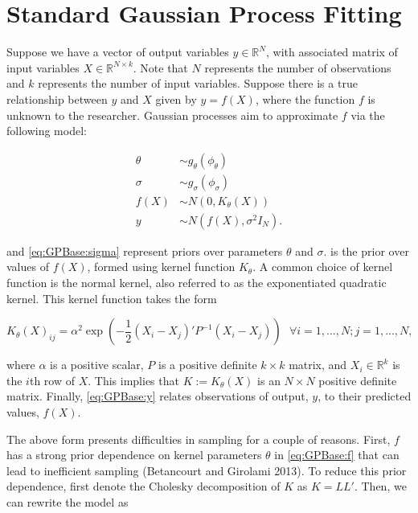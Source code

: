 \documentclass{article}
\newcommand{\RR}{\mathbb{R}}
\begin{document}
	
\section{Standard Gaussian Process Fitting}

\label{sec:fitting}

Suppose we have a vector of output variables $y\in\RR^N$, with associated matrix of input variables $X\in\RR^{N\times k}$. Note that $N$ represents the number of observations and $k$ represents the number of input variables. Suppose there is a true relationship between $y$ and $X$ given by $y = f(X)$, where the function $f$ is unknown to the researcher. Gaussian processes aim to approximate $f$ via the following model:

\begin{subequations}
\begin{align}
	\label{eq:GPBase:theta} \theta &\sim g_\theta(\phi_\theta)\\ 
	\label{eq:GPBase:sigma} \sigma &\sim g_\sigma(\phi_\sigma)\\ 
	\label{eq:GPBase:f} f(X) &\sim N(0, K_\theta(X))\\ 
	\label{eq:GPBase:y} y &\sim N(f(X), \sigma^2 I_N). 
\end{align}
\end{subequations}

\noindent {} and \cref{eq:GPBase:sigma} represent priors over parameters $\theta$ and $\sigma$.  is the prior over values of $f(X)$, formed using kernel function $K_\theta$. A common choice of kernel function is the normal kernel, also referred to as the exponentiated quadratic kernel. This kernel function takes the form

\begin{equation}
	K_\theta(X)_{ij} = \alpha^2 \exp\left(-\frac12 (X_i - X_j)' P^{-1} (X_i - X_j)\right)\mbox{\ \ \ \ }\forall i=1,...,N; j=1,...,N,
\end{equation}

\noindent where $\alpha$ is a positive scalar, $P$ is a positive definite $k\times k$ matrix, and $X_i\in\RR^k$ is the $i$th row of $X$. This implies that $K := K_\theta(X)$ is an $N\times N$ positive definite matrix. Finally, \cref{eq:GPBase:y} relates observations of output, $y$, to their predicted values, $f(X)$.

The above form presents difficulties in sampling for a couple of reasons. First, $f$ has a strong prior dependence on kernel parameters $\theta$ in \cref{eq:GPBase:f} that can lead to inefficient sampling (Betancourt and Girolami 2013). To reduce this prior dependence, first denote the Cholesky decomposition of $K$ as $K = LL'$. Then, we can rewrite the model as 
\end{document}
